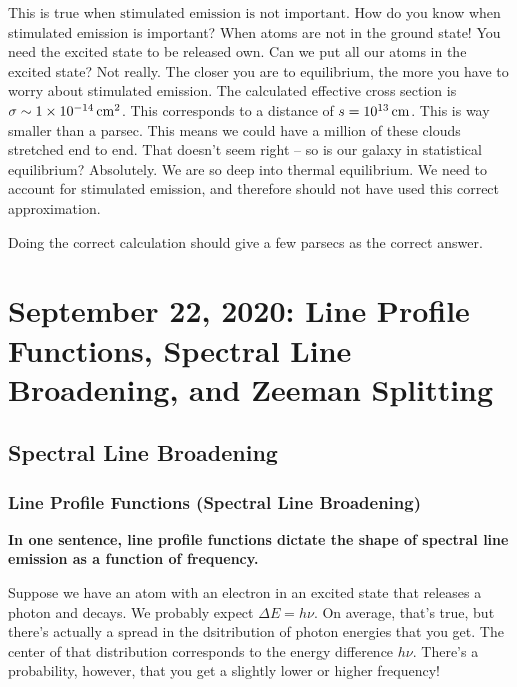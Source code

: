 \documentclass{article}
\newcommand{\unit}[1]{{\,\rm #1}}
\newcommand{\cm}{\unit{cm}}
\begin{document}
This is true when $\boxed{\text{stimulated emission is not important}}$. How do you know when stimulated emission is important? When atoms are not in the ground state! You need the excited state to be released own. Can we put all our atoms in the excited state? Not really. The closer you are to equilibrium, the more you have to worry about stimulated emission. The calculated effective cross section is $\sigma \sim 1 \times 10^{-14} \cm^2$. This corresponds to a distance of $s = 10^{13} \cm$. This is way smaller than a parsec. This means we could have a million of these clouds stretched end to end. That doesn't seem right -- so is our galaxy in statistical equilibrium? Absolutely. We are so deep into thermal equilibrium. We need to account for stimulated emission, and therefore should not have used this correct approximation. 

Doing the correct calculation should give a few parsecs as the correct answer. 


\newpage
\section{September 22, 2020: Line Profile Functions, Spectral Line Broadening, and Zeeman Splitting}

\subsection{Spectral Line Broadening}

\subsubsection{Line Profile Functions (Spectral Line Broadening)}

\textbf{In one sentence, line profile functions dictate the shape of spectral line emission as a function of frequency. }

Suppose we have an atom with an electron in an excited state that releases a photon and decays. We probably expect $\Delta E = h \nu$. On average, that's true, but there's actually a spread in the dsitribution of photon energies that you get. The center of that distribution corresponds to the energy difference $h \nu$. There's a probability, however, that you get a slightly lower or higher frequency!
\end{document}

